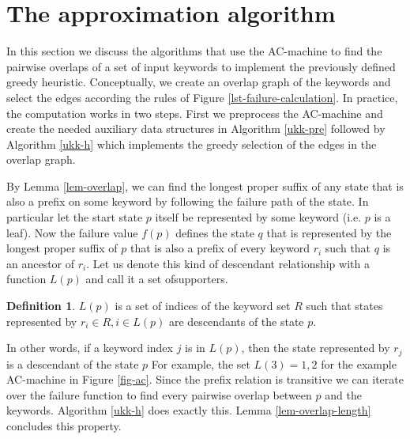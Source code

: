 \documentclass[english,twoside,censored,csm,algorithms-track-2020]{HYthesisML}
\theoremstyle{plain}
\theoremstyle{definition}
\newtheorem{definition}[theorem]{Definition}
\begin{document}
\section{The approximation algorithm}

In this section we discuss the algorithms that use the AC-machine to find the pairwise overlaps
of a set of input keywords to implement the previously defined greedy heuristic. Conceptually,
we create an overlap graph of the keywords and select the edges according the rules of
Figure \ref{lst-failure-calculation}. In practice, the computation works in two steps. First we
preprocess the AC-machine and create the needed auxiliary data structures in Algorithm \ref{ukk-pre}
followed by Algorithm \ref{ukk-h} which implements the greedy selection of the edges in the
overlap graph.

By Lemma \ref{lem-overlap}, we can find the longest proper suffix of any state that is also
a prefix on some keyword by following the failure path of the state. In particular let the start
state $p$ itself be represented by some keyword (i.e. $p$ is a leaf). Now the failure value $f(p)$
defines the state $q$ that is represented by the longest proper suffix of $p$ that is also a prefix
of every keyword $r_i$ such that $q$ is an ancestor of $r_i$.
Let us denote this kind of descendant relationship with a function $L(p)$ and call it a set ofsupporters.

\begin{definition}
$L(p)$ is a set of indices of the keyword set $R$ such that states represented by
$r_i\in R, i\in L(p)$ are descendants of the state $p$.
\end{definition}

In other words, if a keyword index
$j$ is in $L(p)$, then the state represented by $r_j$ is a descendant of the state $p$
For example, the set $L(3) = 1,2$ for the example AC-machine in Figure \ref{fig-ac}.
Since the prefix relation is transitive we can iterate over the failure function to find every
pairwise overlap between $p$ and the keywords. Algorithm \ref{ukk-h} does exactly this.
Lemma \ref{lem-overlap-length} concludes this property.


\end{document}
